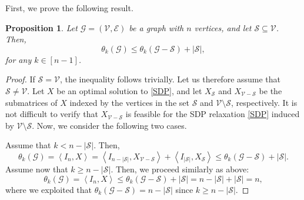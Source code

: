 \documentclass[11pt, a4paper]{article}
\newtheorem{proposition}[theorem]{Proposition}
\newcommand{\IP}[2]{\left\langle #1, #2 \right\rangle}
\newcommand{\mc}{\mathcal}
\begin{document}
First, we prove the following result.
\begin{proposition}\label{prop:compareTheta3}
    Let $\mc{G}=(\mc{V},\mc{E})$  be a graph with $n$ vertices, and let $\mc{S} \subseteq \mc{V}$. Then,  
    $$ \theta_k(\mc{G}) \leq \theta_k(\mc{G} -\mc{S}) + |\mc{S}|,$$
    for any $k \in [n-1]$.
\end{proposition}
\begin{proof}
    If $\mc{S}=\mc{V}$, the inequality follows trivially.
    Let us therefore assume that $\mc{S} \neq \mc{V}$. 
    Let $X$ be an optimal solution to \eqref{SDP}, and let $X_{\mc{S}}$ and $X_{\mc{V}- \mc{S}}$ be the submatrices of $X$ indexed by the vertices in the set $\mc{S}$ and $\mc{V}\setminus \mc{S}$, respectively.
    It is not difficult to verify that $X_{\mc{V}- \mc{S}}$ is feasible for the SDP relaxation \eqref{SDP} induced by $\mc{V}\setminus \mc{S}$.
    Now, we consider the following two cases.
    
    Assume that  $k < n-|\mc{S}|$. Then, 
    $$ \theta_k(\mc{G}) = \IP{I_n}{X}  = \IP{I_{n-|\mc{S}|}}{X_{\mc{V}- \mc{S}}} + 
    \IP{I_{|\mc{S}|}}{X_{\mc{S}}} \leq \theta_k(\mc{G}-\mc{S}) + |\mc{S}|. $$
    Assume now that $k\geq n-|\mc{S}|$. 
    Then, we proceed similarly as above:
    $$ \theta_k(\mc{G}) = \IP{I_n}{X} \leq \theta_k(\mc{G}-\mc{S}) + |\mc{S}| = n-|\mc{S}| + |\mc{S}| = n, $$
    where we exploited that $\theta_k(\mc{G}-\mc{S}) = n-|\mc{S}|$ since $k\geq n-|\mc{S}|$. 
\end{proof}
\end{document}
